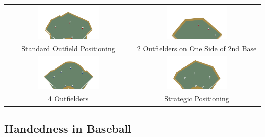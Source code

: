 \documentclass{article}
\begin{document}
\begin{center}
\begin{tabular}{cc}  
    \includegraphics[width=0.5\textwidth]{images/standardOut.png} & 
    \includegraphics[width=0.5\textwidth]{images/3OF2B.png} \\
    Standard Outfield Positioning & 2 Outfielders on One Side of 2nd Base \\
    \includegraphics[width=0.5\textwidth]{images/4OF.png} & 
    \includegraphics[width=0.5\textwidth]{images/strategicOut.png} \\
    4 Outfielders & Strategic Positioning \\
\end{tabular}
\end{center}
\vspace{1.5cm}

\subsection{Handedness in Baseball}
\end{document}
